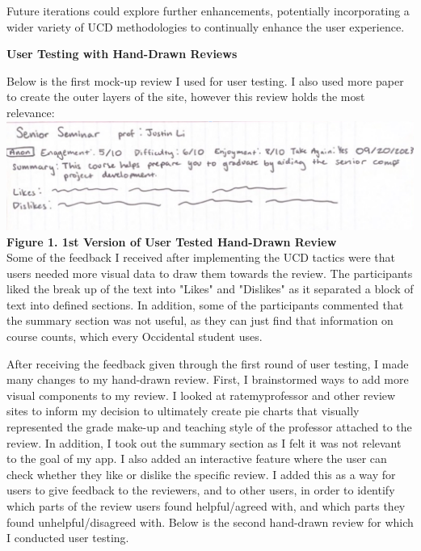 \documentclass[10pt,twocolumn]{article}
\begin{document}
Future iterations could explore further enhancements, potentially incorporating a wider variety of UCD methodologies to continually enhance the user experience.


\begin{center} \textbf{User Testing with Hand-Drawn Reviews}\\ \end{center}


Below is the first mock-up review I used for user testing. I also used more paper to create the outer layers of the site, however this review holds the most relevance:\\


\includegraphics[scale=.25]{UT1}\\ \textbf{\footnotesize{Figure 1. 1st Version of User Tested Hand-Drawn Review}}\\

Some of the feedback I received after implementing the UCD tactics were that users needed more visual data to draw them towards the review. The participants liked the break up of the text into "Likes" and "Dislikes" as it separated a block of text into defined sections. In addition, some of the participants commented that the summary section was not useful, as they can just find that information on course counts, which every Occidental student uses. 

After receiving the feedback given through the first round of user testing, I made many changes to my hand-drawn review. First, I brainstormed ways to add more visual components to my review. I looked at ratemyprofessor and other review sites to inform my decision to ultimately create pie charts that visually represented the grade make-up and teaching style of the professor attached to the review. In addition, I took out the summary section as I felt it was not relevant to the goal of my app. I also added an interactive feature where the user can check whether they like or dislike the specific review. I added this as a way for users to give feedback to the reviewers, and to other users, in order to identify which parts of the review users found helpful/agreed with, and which parts they found unhelpful/disagreed with. Below is the second hand-drawn review for which I conducted user testing.
\end{document}
